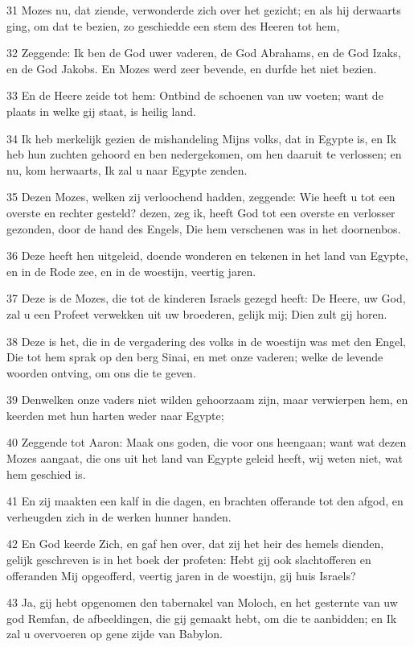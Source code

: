 \par 31 Mozes nu, dat ziende, verwonderde zich over het gezicht; en als hij derwaarts ging, om dat te bezien, zo geschiedde een stem des Heeren tot hem,
\par 32 Zeggende: Ik ben de God uwer vaderen, de God Abrahams, en de God Izaks, en de God Jakobs. En Mozes werd zeer bevende, en durfde het niet bezien.
\par 33 En de Heere zeide tot hem: Ontbind de schoenen van uw voeten; want de plaats in welke gij staat, is heilig land.
\par 34 Ik heb merkelijk gezien de mishandeling Mijns volks, dat in Egypte is, en Ik heb hun zuchten gehoord en ben nedergekomen, om hen daaruit te verlossen; en nu, kom herwaarts, Ik zal u naar Egypte zenden.
\par 35 Dezen Mozes, welken zij verloochend hadden, zeggende: Wie heeft u tot een overste en rechter gesteld? dezen, zeg ik, heeft God tot een overste en verlosser gezonden, door de hand des Engels, Die hem verschenen was in het doornenbos.
\par 36 Deze heeft hen uitgeleid, doende wonderen en tekenen in het land van Egypte, en in de Rode zee, en in de woestijn, veertig jaren.
\par 37 Deze is de Mozes, die tot de kinderen Israels gezegd heeft: De Heere, uw God, zal u een Profeet verwekken uit uw broederen, gelijk mij; Dien zult gij horen.
\par 38 Deze is het, die in de vergadering des volks in de woestijn was met den Engel, Die tot hem sprak op den berg Sinai, en met onze vaderen; welke de levende woorden ontving, om ons die te geven.
\par 39 Denwelken onze vaders niet wilden gehoorzaam zijn, maar verwierpen hem, en keerden met hun harten weder naar Egypte;
\par 40 Zeggende tot Aaron: Maak ons goden, die voor ons heengaan; want wat dezen Mozes aangaat, die ons uit het land van Egypte geleid heeft, wij weten niet, wat hem geschied is.
\par 41 En zij maakten een kalf in die dagen, en brachten offerande tot den afgod, en verheugden zich in de werken hunner handen.
\par 42 En God keerde Zich, en gaf hen over, dat zij het heir des hemels dienden, gelijk geschreven is in het boek der profeten: Hebt gij ook slachtofferen en offeranden Mij opgeofferd, veertig jaren in de woestijn, gij huis Israels?
\par 43 Ja, gij hebt opgenomen den tabernakel van Moloch, en het gesternte van uw god Remfan, de afbeeldingen, die gij gemaakt hebt, om die te aanbidden; en Ik zal u overvoeren op gene zijde van Babylon.
